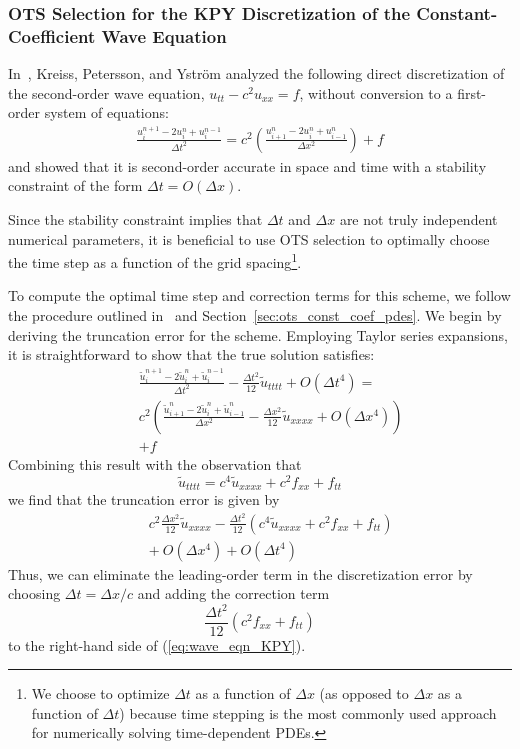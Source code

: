 \documentclass[twocolumn]{article} %
\newcommand{\beq}{\begin{equation}}
\newcommand{\eeq}{\end{equation}}
\newcommand{\bea}{\begin{eqnarray}}
\newcommand{\eea}{\end{eqnarray}}
\def\tu{\tilde{u}}
\def\dt{\Delta t}
\def\dx{\Delta x}
\begin{document}
\subsubsection*{OTS Selection for the KPY Discretization of the 
  Constant-Coefficient Wave Equation}
In~\cite{kreiss2002}, Kreiss, Petersson, and Ystr\"om analyzed the following
direct discretization of the second-order wave equation, 
$u_{tt} - c^2 u_{xx} = f$,
without conversion to a first-order system of equations:
\bea
    \frac{u^{n+1}_i - 2 u^n_i + u^{n-1}_i}{\dt^2}
  = c^2 \left( \frac{u^{n}_{i+1} - 2 u^n_i + u^n_{i-1}}{\dx^2} \right)
  + f
  \label{eq:wave_eqn_KPY}
\eea
and showed that it is second-order accurate in space and time with a 
stability constraint of the form $\dt = O(\dx)$.

Since the stability constraint implies that $\dt$ and $\dx$ are not truly
independent numerical parameters, it is beneficial to use OTS selection to 
optimally choose the time step as a function of the grid 
spacing\footnote{We choose to optimize $\dt$ as a function of $\dx$ (as 
opposed to $\dx$ as a function of $\dt$) because time stepping is the most 
commonly used approach for numerically solving time-dependent PDEs.}.

To compute the optimal time step and correction terms for this scheme, we 
follow the procedure outlined in~\cite{chu_otspde} and 
Section~\ref{sec:ots_const_coef_pdes}.  We begin by deriving the truncation 
error for the scheme.  Employing Taylor series expansions, it is 
straightforward to show that the true solution satisfies:
\bea
  & &\frac{\tu^{n+1}_i - 2 \tu^n_i + \tu^{n-1}_i}{\dt^2}
    - \frac{\dt^2}{12} \tu_{tttt} + O(\dt^4)
  = \nonumber \\
  & & c^2 \left( \frac{\tu^{n}_{i+1} - 2 \tu^n_i + \tu^n_{i-1}}{\dx^2} 
  -\frac{\dx^2}{12} \tu_{xxxx} + O(\dx^4) \right)
  \nonumber \\
  & & +f
\eea
Combining this result with the observation that 
\beq
  \tu_{tttt} = c^4 \tu_{xxxx} + c^2 f_{xx} + f_{tt}
\eeq
we find that the truncation error is given by
\bea
    & & c^2 \frac{\dx^2}{12} \tu_{xxxx} 
    - \frac{\dt^2}{12} \left(c^4\tu_{xxxx} + c^2 f_{xx} + f_{tt} \right) 
    \nonumber \\
    & & + \ O(\dx^4) + O(\dt^4) 
\eea
Thus, we can eliminate the leading-order term in the discretization
error by choosing $\dt = \dx/c$ and adding the correction term 
\beq
  \frac{\dt^2}{12} \left(c^2 f_{xx} + f_{tt} \right) 
\eeq
to the right-hand side of (\ref{eq:wave_eqn_KPY}).  
\end{document}
